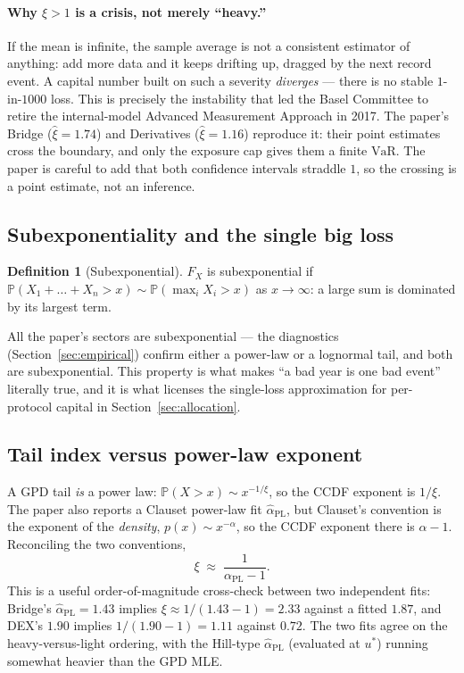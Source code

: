 \documentclass[11pt]{article}
\theoremstyle{definition}
\newtheorem{definition}[theorem]{Definition}
\theoremstyle{remark}
\theoremstyle{definition}
\newcommand{\Prob}{\mathbb{P}}
\newcommand{\VaR}{\mathrm{VaR}}
\newcommand{\1}{\mathbf{1}}
\begin{document}
\paragraph{Why $\xi>1$ is a crisis, not merely ``heavy.''}
If the mean is infinite, the sample average is not a consistent estimator of
anything: add more data and it keeps drifting up, dragged by the next record
event. A capital number built on such a severity \emph{diverges} --- there is
no stable $1$-in-$1000$ loss. This is precisely the instability that led the
Basel Committee to retire the internal-model Advanced Measurement Approach in
2017. The paper's Bridge ($\hat\xi=1.74$) and Derivatives ($\hat\xi=1.16$)
reproduce it: their point estimates cross the boundary, and only the exposure
cap gives them a finite $\VaR$. The paper is careful to add that both
confidence intervals straddle $1$, so the crossing is a point estimate, not an
inference.

\subsection{Subexponentiality and the single big loss}\label{sec:subexp}

\begin{definition}[Subexponential]
$F_X$ is subexponential if $\Prob(X_1+\dots+X_n>x)\sim\Prob(\max_i X_i>x)$ as
$x\to\infty$: a large sum is dominated by its largest term.
\end{definition}

All the paper's sectors are subexponential --- the diagnostics
(Section~\ref{sec:empirical}) confirm either a power-law or a lognormal tail, and both
are subexponential. This property is what makes ``a bad year is one bad event''
literally true, and it is what licenses the single-loss approximation for
per-protocol capital in Section~\ref{sec:allocation}.

\subsection{Tail index versus power-law exponent}

A GPD tail \emph{is} a power law: $\Prob(X>x)\sim x^{-1/\xi}$, so the CCDF
exponent is $1/\xi$. The paper also reports a Clauset power-law fit
$\hat\alpha_{\text{PL}}$, but Clauset's convention is the exponent of the
\emph{density}, $p(x)\sim x^{-\alpha}$, so the CCDF exponent there is
$\alpha-1$. Reconciling the two conventions,
\begin{equation}\label{eq:xialpha}
\xi \;\approx\; \frac{1}{\alpha_{\text{PL}}-1}.
\end{equation}
This is a useful order-of-magnitude cross-check between two independent fits:
Bridge's $\hat\alpha_{\text{PL}}=1.43$ implies
$\xi\approx 1/(1.43-1)=2.33$ against a fitted $1.87$, and DEX's $1.90$ implies
$1/(1.90-1)=1.11$ against $0.72$. The two fits agree on the heavy-versus-light
ordering, with the Hill-type $\hat\alpha_{\text{PL}}$ (evaluated at $u^*$)
running somewhat heavier than the GPD MLE.
\end{document}
